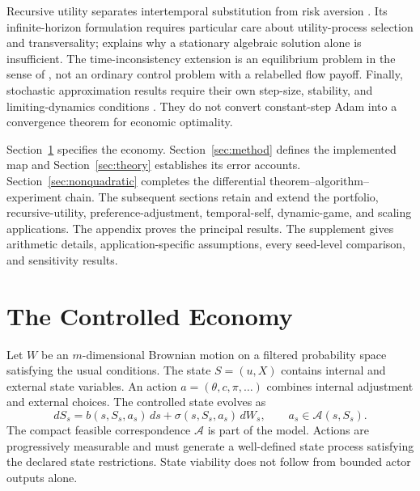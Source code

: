\documentclass[ecta,draft]{econsocart}
\theoremstyle{definition}
\theoremstyle{remark}
\newcommand{\Act}{\mathcal A}
\begin{document}
Recursive utility separates intertemporal substitution from risk aversion \citep{epsteinzin1989,duffieepstein1992}. Its infinite-horizon formulation requires particular care about utility-process selection and transversality; \citet{herdegen2021} explains why a stationary algebraic solution alone is insufficient. The time-inconsistency extension is an equilibrium problem in the sense of \citet{bjork2016}, not an ordinary control problem with a relabelled flow payoff. Finally, stochastic approximation results require their own step-size, stability, and limiting-dynamics conditions \citep{borkar2024}. They do not convert constant-step Adam into a convergence theorem for economic optimality.

Section~\ref{sec:model} specifies the economy. Section~\ref{sec:method} defines the implemented map and Section~\ref{sec:theory} establishes its error accounts. Section~\ref{sec:nonquadratic} completes the differential theorem--algorithm--experiment chain. The subsequent sections retain and extend the portfolio, recursive-utility, preference-adjustment, temporal-self, dynamic-game, and scaling applications. The appendix proves the principal results. The supplement gives arithmetic details, application-specific assumptions, every seed-level comparison, and sensitivity results.

\section{The Controlled Economy}\label{sec:model}
Let $W$ be an $m$-dimensional Brownian motion on a filtered probability space satisfying the usual conditions. The state $S=(u,X)$ contains internal and external state variables. An action $a=(\theta,c,\pi,\ldots)$ combines internal adjustment and external choices. The controlled state evolves as
\begin{equation}\label{eq:state}
 dS_s=b(s,S_s,a_s)\,ds+\sigma(s,S_s,a_s)\,dW_s,
 \qquad a_s\in\Act(s,S_s).
\end{equation}
The compact feasible correspondence $\Act$ is part of the model. Actions are progressively measurable and must generate a well-defined state process satisfying the declared state restrictions. State viability does not follow from bounded actor outputs alone.
\end{document}
